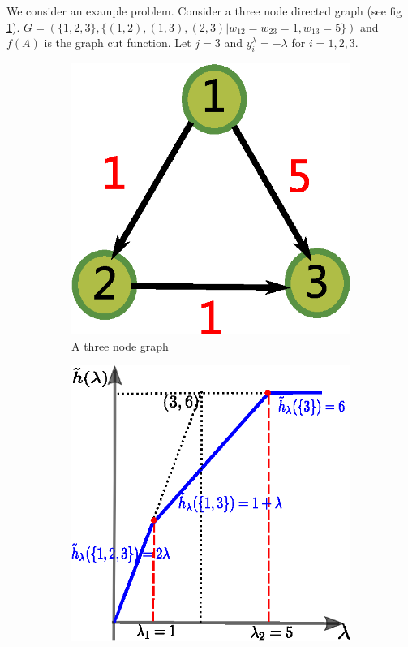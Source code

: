 \documentclass{article}
\begin{document}
\begin{example}\label{ex:3point}
We consider an example problem. Consider a three node directed graph (see fig \ref{fig:ex}). $G=(\{1,2,3\},\{(1,2),(1,3),(2,3)| w_{12}=w_{23}=1, w_{13}=5\})$ and $f(A)$ is the graph cut function. Let $j=3$ and $y^{\lambda}_i = -\lambda$ for $i=1,2,3$.
\begin{figure}[!ht]
\centering
\begin{subfigure}{0.45\textwidth}
\includegraphics[width=\textwidth]{pic/example_directed.eps}
\caption{A three node graph}\label{fig:ex}
\end{subfigure}
\begin{subfigure}{0.45\textwidth}
\includegraphics[width=\textwidth]{pic/example_pst_single.eps}

\end{subfigure}
\end{figure}
\end{example}
\end{document}
